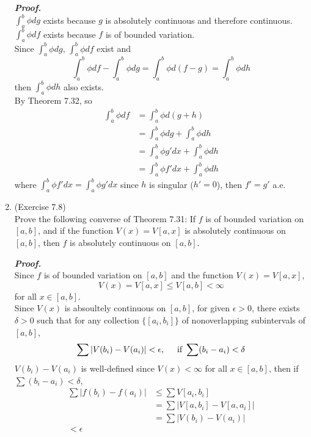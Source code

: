 \documentclass[a4paper,11pt]{article}
\begin{document}
\begin{enumerate}
 		\textit{\textbf {Proof.}}\\
 		$\int_a^b \phi dg$ exists because $g$ is absolutely continuous and therefore continuous.\\
 		$\int_a^b \phi df$ exists  because $f$ is of bounded variation.\\

 		Since $\int_a^b \phi dg$, $\int_a^b \phi df$ exist and
 		$$\int_a^b \phi df - \int_a^b \phi dg = \int_a^b \phi d(f-g) = \int_a^b \phi dh$$
 		then $\int_a^b \phi dh$ also exists.\\

 		By Theorem 7.32, so
 		$$\begin{aligned}
 		\int_a^b \phi df
 		&= \int_a^b \phi d(g+h)\\
 		&= \int_a^b \phi dg + \int_a^b \phi dh\\
 		&= \int_a^b \phi g' dx + \int_a^b \phi dh\\
 		&= \int_a^b \phi f' dx + \int_a^b \phi dh
 		\end{aligned}$$
 		where $\int_a^b \phi f' dx = \int_a^b \phi g' dx$ since $h$ is singular ($h' = 0$), then $f' = g'$ a.e.\\








 	\item (Exercise 7.8)\\
 		Prove  the following converse of Theorem 7.31: If $f$ is of bounded variation on $[a,b]$, and if the function $V(x) = V[a, x]$ is absolutely continuous on $[a,b]$, then $f$ is absolutely continuous on $[a,b]$.\

 		\textit{\textbf {Proof.}}\\
 		Since $f$ is of bounded variation on $[a,b]$ and the function $V(x) = V[a, x]$,
 		$$V(x) = V[a, x] \leq V[a,b] < \infty$$
 		for all $x \in [a,b]$.\\

 		Since $V(x)$ is absoultely continuous on $[a,b]$, for given $\epsilon > 0$, there exists $\delta > 0$ such that for any collection $\{[a_i,b_i]\}$ of nonoverlapping subintervals of $[a,b]$,
 		$$\sum |V(b_i) - V(a_i)| < \epsilon, \hspace{0.5cm} \mbox{if } \sum (b_i - a_i) < \delta$$
 		$V(b_i) - V(a_i)$ is well-defined since $V(x) < \infty$ for all $x \in [a,b]$, then if $\sum (b_i - a_i) < \delta$,
 		$$\begin{aligned}
 		\sum |f(b_i) - f(a_i)|
 		&\leq \sum V[a_i,b_i]\\
 		&= \sum |V[a,b_i] - V[a,a_i]|\\
 		&= \sum |V(b_i) - V(a_i)|\\
 		< \epsilon
 		\end{aligned}$$


\end{enumerate}
\end{document}
